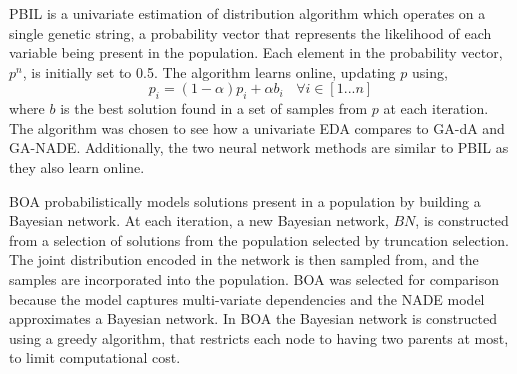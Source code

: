 \documentclass[twoside]{article}
\begin{document}
PBIL is a univariate estimation of distribution algorithm which operates on a single genetic string, a probability vector that represents the likelihood of each variable being present in the population. Each element in the probability vector, \(p^n\),  is initially set to 0.5. The algorithm learns online, updating \(p\) using,
\[
p_i = (1-\alpha)p_i + \alpha b_i \ \ \ \ \forall{i \in{[1 ... n]}}
\]
where \(b\) is the best solution found in a set of samples from \(p\) at each iteration. The algorithm was chosen to see how a univariate EDA compares to GA-dA and GA-NADE. Additionally, the two neural network methods are similar to PBIL as they also learn online.

BOA probabilistically models solutions present in a population by building a Bayesian network. At each iteration, a new Bayesian network, \(BN\), is constructed from a selection of solutions from the population selected by truncation selection. The joint distribution encoded in the network is then sampled from, and the samples are incorporated into the population. BOA was selected for comparison because the model captures multi-variate dependencies and the NADE model approximates a Bayesian network. In BOA the Bayesian network is constructed using a greedy algorithm, that restricts each node to having two parents at most, to limit computational cost.
\end{document}
